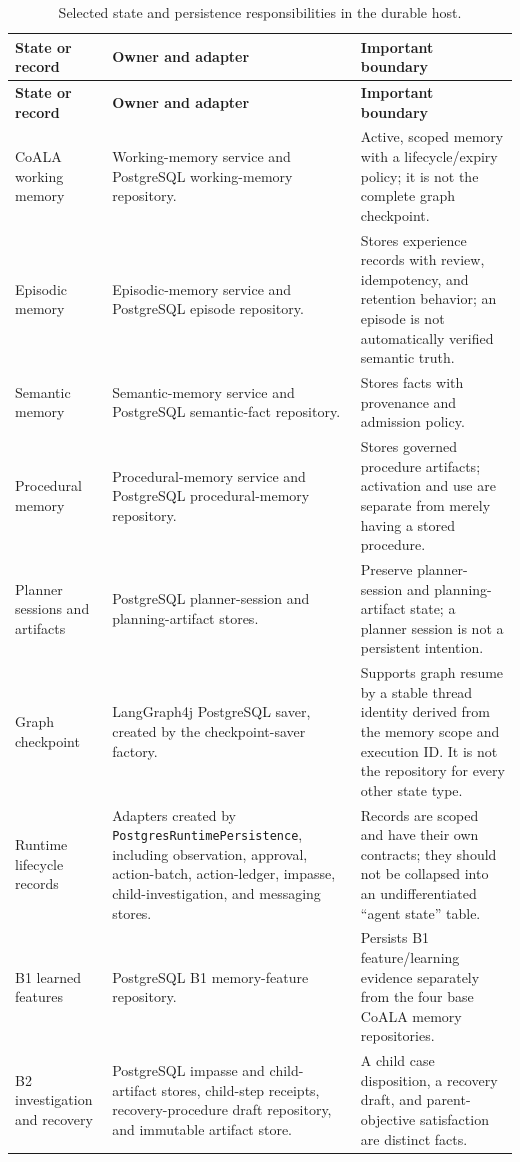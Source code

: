 \begin{longtable}{P{0.19\textwidth} P{0.39\textwidth} P{0.32\textwidth}}
\caption{Selected state and persistence responsibilities in the durable host.}\label{tab:appendix-c-persistence}\\
\toprule
\textbf{State or record} & \textbf{Owner and adapter} & \textbf{Important boundary} \\
\midrule
\endfirsthead
\toprule
\textbf{State or record} & \textbf{Owner and adapter} & \textbf{Important boundary} \\
\midrule
\endhead
CoALA working memory & Working-memory service and PostgreSQL working-memory repository. & Active, scoped memory with a lifecycle/expiry policy; it is not the complete graph checkpoint. \\
Episodic memory & Episodic-memory service and PostgreSQL episode repository. & Stores experience records with review, idempotency, and retention behavior; an episode is not automatically verified semantic truth. \\
Semantic memory & Semantic-memory service and PostgreSQL semantic-fact repository. & Stores facts with provenance and admission policy. \\
Procedural memory & Procedural-memory service and PostgreSQL procedural-memory repository. & Stores governed procedure artifacts; activation and use are separate from merely having a stored procedure. \\
Planner sessions and artifacts & PostgreSQL planner-session and planning-artifact stores. & Preserve planner-session and planning-artifact state; a planner session is not a persistent intention. \\
Graph checkpoint & LangGraph4j PostgreSQL saver, created by the checkpoint-saver factory. & Supports graph resume by a stable thread identity derived from the memory scope and execution ID. It is not the repository for every other state type. \\
Runtime lifecycle records & Adapters created by \texttt{PostgresRuntimePersistence}, including observation, approval, action-batch, action-ledger, impasse, child-investigation, and messaging stores. & Records are scoped and have their own contracts; they should not be collapsed into an undifferentiated ``agent state'' table. \\
B1 learned features & PostgreSQL B1 memory-feature repository. & Persists B1 feature/learning evidence separately from the four base CoALA memory repositories. \\
B2 investigation and recovery & PostgreSQL impasse and child-artifact stores, child-step receipts, recovery-procedure draft repository, and immutable artifact store. & A child case disposition, a recovery draft, and parent-objective satisfaction are distinct facts. \\

\end{longtable}
